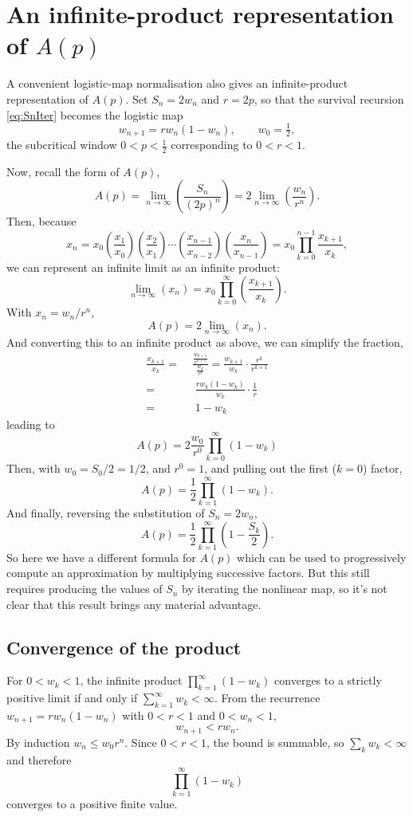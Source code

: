 \documentclass[11pt]{article}
\begin{document}
\section{An infinite-product representation of \texorpdfstring{$A(p)$}{A(p)}}
\label{sec:product}

A convenient logistic-map normalisation also gives an infinite-product representation of $A(p)$.
Set $S_n=2w_n$ and $r=2p$, so that the survival recursion \eqref{eq:SnIter} becomes the logistic map
\[
w_{n+1}=r w_n(1-w_n),
\qquad w_0=\tfrac12,
\]
the subcritical window $0<p<\tfrac12$ corresponding to $0<r<1$.

\noindent
Now, recall the form of $A(p)$,
$$A(p) = \lim_{n\to\infty} \left(\frac{S_n}{(2p)^n}\right) = 2\lim_{n\to\infty}\left(\frac{w_n}{r^n}\right).$$
Then, because
$$x_n = x_0\left(\frac{x_{1}}{x_{0}}\right)\left(\frac{x_{2}}{x_{1}}\right)\cdots\left(\frac{x_{n-1}}{x_{n-2}}\right)\left(\frac{x_{n}}{x_{n-1}}\right) = x_0\prod^{n-1}_{k=0} \frac{x_{k+1}}{x_k},$$
we can represent an infinite limit as an infinite product: 
$$\lim_{n\to\infty}(x_n) = x_0\prod^\infty_{k=0}\left(\frac{x_{k+1}}{x_k}\right).$$
With $x_n = w_n/r^n$,
$$A(p) = 2\lim_{n\to\infty}\left(x_n\right).$$
And converting this to an infinite product as above, we can simplify the fraction,
\begin{align*}
\frac{x_{k+1}}{x_k} =&\; \frac{\frac{w_{k+1}}{r^{k+1}}}{\frac{w_k}{r^k}} = \frac{w_{k+1}}{w_k}\cdot\frac{r^k}{r^{k+1}}\\
=& \;\;\frac{rw_k(1-w_k)}{w_k}\cdot\frac{1}{r}\\ 
=& \;\; 1-w_k
\end{align*}
leading to
$$A(p) = 2\frac{w_0}{r^0}\prod^\infty_{k=0}(1-w_k)$$
Then, with $w_0 = S_0/2 = 1/2$, and $r^0 = 1$, and pulling out the first ($k=0$) factor,
$$A(p) = \frac{1}{2}\prod^\infty_{k=1}\left(1-w_k\right).$$
And finally, reversing the substitution of $S_n = 2w_n$,
\begin{equation}
A(p) = \frac{1}{2}\prod_{k=1}^{\infty}\left(1-\frac{S_k}{2}\right).\label{eq:prodFormula}
\end{equation}
So here we have a different formula for $A(p)$ which can be used to progressively compute an approximation by multiplying successive factors. But this still requires producing the values of $S_n$ by iterating the nonlinear map, so it's not clear that this result brings any material advantage. 


\subsection{Convergence of the product}
For $0<w_k<1$, the infinite product $\prod_{k=1}^{\infty}(1-w_k)$ converges to a strictly positive limit if and only if $\sum_{k=1}^{\infty}w_k<\infty$.
From the recurrence $w_{n+1}=r w_n(1-w_n)$ with $0<r<1$ and $0<w_n<1$,
\[
w_{n+1}<r w_n.
\]
By induction $w_n\le w_0 r^n$. Since $0<r<1$, the bound is summable, so $\sum_k w_k<\infty$ and therefore
\[
\prod_{k=1}^{\infty}(1-w_k)
\]
converges to a positive finite value.
\end{document}
